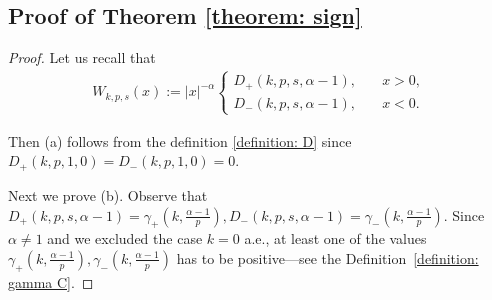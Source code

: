 \documentclass[12pt, a4paper]{amsart}
\begin{document}
\subsection*{Proof of Theorem \texorpdfstring{\cref{theorem: sign}}{Theorem sign}}
\begin{proof}
Let us recall that
\begin{align*}
    W_{k, p, s}(x) := |x|^{-\alpha}\begin{cases}
        D_+(k, p, s, \alpha - 1), &\quad x > 0,
        \\
        D_-(k, p, s, \alpha - 1), &\quad x < 0.
    \end{cases}
\end{align*}

Then (a) follows from the definition \cref{definition: D} since $D_+(k, p, 1, 0) = D_{-}(k, p, 1, 0) = 0$.

Next we prove (b). Observe that $D_+(k, p, s, \alpha-1) = \gamma_+(k, \frac{\alpha-1}{p}), D_{-}(k, p, s, \alpha-1) = \gamma_-(k, \frac{\alpha-1}{p})$. Since $\alpha \neq 1$ and we excluded the case $k = 0$ a.e., at least one of the values $\gamma_+(k, \frac{\alpha-1}{p}), \gamma_-(k, \frac{\alpha-1}{p})$ has to be positive---see the Definition~\ref{definition: gamma C}.


\end{proof}
\end{document}
